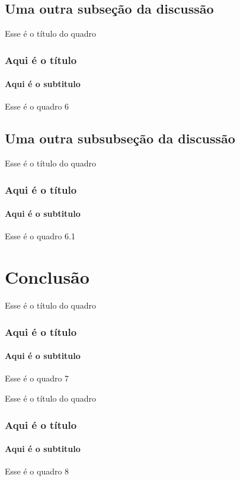 \documentclass{beamer}
\begin{document}
	\subsection{Uma outra subseção da discussão}
	\begin{frame}{Esse é o título do quadro}
		\frametitle{Aqui é o título}
		\framesubtitle{Aqui é o subtitulo}
		Esse é o quadro 6
	\end{frame}
	
	\subsection{Uma outra subsubseção da discussão}
	\begin{frame}{Esse é o título do quadro}
		\frametitle{Aqui é o título}
		\framesubtitle{Aqui é o subtitulo}
		Esse é o quadro 6.1
	\end{frame}
	
	\section{Conclusão}
	\begin{frame}{Esse é o título do quadro}
		\frametitle{Aqui é o título}
		\framesubtitle{Aqui é o subtitulo}
		Esse é o quadro 7
	\end{frame}
	
	\begin{frame}{Esse é o título do quadro}
		\frametitle{Aqui é o título}
		\framesubtitle{Aqui é o subtitulo}
		Esse é o quadro 8
	\end{frame}
	
	
\end{document}
